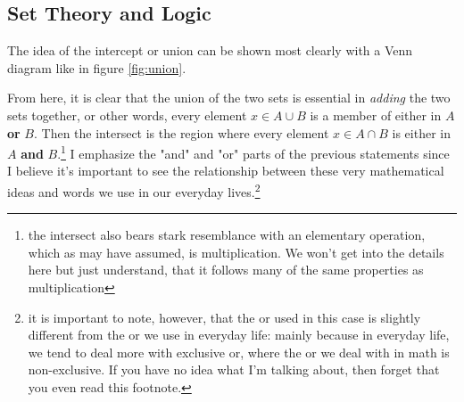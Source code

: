 \documentclass[11pt]{article}
\numberwithin{lemma}{section}
\numberwithin{equation}{section}
\numberwithin{define}{section}
\numberwithin{prop}{section}
\numberwithin{figure}{section}
\numberwithin{theorem}{section}
\newcounter{ex}[section]
\numberwithin{ex}{section}
\begin{document}
\subsection{Set Theory and Logic}
The idea of the intercept or union can be shown most clearly with a Venn diagram like in figure \eqref{fig:union}.
\begin{figure}[h]
\centering
{}
	\caption{}
	\label{fig:union}
\end{figure}
From here, it is clear that the union of the two sets is essential in \textit{adding} the two sets together, or other words, every element $x\in A\cup B$ is a member of either in $A$ \textbf{or} $B$. 
Then the intersect is the region where every element $x\in A\cap B$ is either in $A$ \textbf{and} $B$.\footnote{the intersect also bears stark resemblance with an elementary operation, which as may have assumed, is multiplication. 
We won't get into the details here but just understand, that it follows many of the same properties as multiplication}
I emphasize the "and" and "or" parts of the previous statements since I believe it's important to see the relationship between these very mathematical ideas and words we use in our everyday lives.\footnote{
it is important to note, however, that the or used in this case is slightly different from the or we use in everyday life: mainly because in everyday life, we tend to deal more with exclusive or, where the or we deal with in math is non-exclusive. 
If you have no idea what I'm talking about, then forget that you even read this footnote.}
\end{document}
